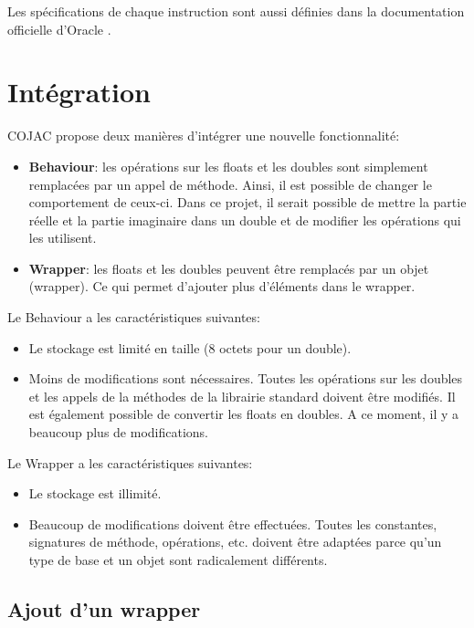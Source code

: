 Les spécifications de chaque instruction sont aussi définies dans la documentation officielle d'Oracle \cite{java-bytecode-documentation}.

\section{Intégration}
\label{sec:cojac_integration}

COJAC \cite{COJAC} propose deux manières d'intégrer une nouvelle fonctionnalité:
\begin{itemize}
    \item \textbf{Behaviour}: les opérations sur les floats et les doubles sont simplement remplacées par un appel de méthode. Ainsi, il est possible de changer le comportement de ceux-ci. Dans ce projet, il serait possible de mettre la partie réelle et la partie imaginaire dans un double et de modifier les opérations qui les utilisent.
    \item \textbf{Wrapper}: les floats et les doubles peuvent être remplacés par un objet (wrapper). Ce qui permet d'ajouter plus d'éléments dans le wrapper.
\end{itemize}

Le Behaviour a les caractéristiques suivantes:
\begin{itemize}
    \item Le stockage est limité en taille (8 octets pour un double).
    \item Moins de modifications sont nécessaires. Toutes les opérations sur les doubles et les appels de la méthodes de la librairie standard doivent être modifiés. Il est également possible de convertir les floats en doubles. A ce moment, il y a beaucoup plus de modifications.
\end{itemize}

Le Wrapper a les caractéristiques suivantes:
\begin{itemize}
    \item Le stockage est illimité.
    \item Beaucoup de modifications doivent être effectuées. Toutes les constantes, signatures de méthode, opérations, etc. doivent être adaptées parce qu'un type de base et un objet sont radicalement différents.
\end{itemize}

\subsection{Ajout d'un wrapper}


